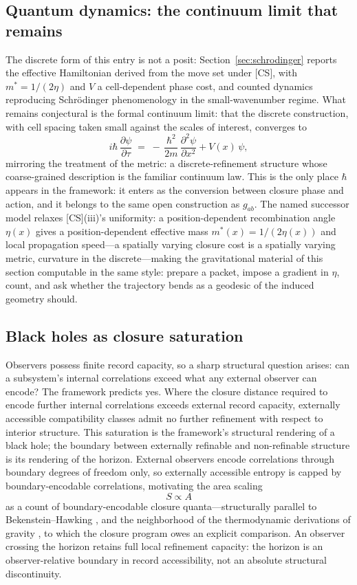 \documentclass[11pt]{article}
\theoremstyle{definition}
\theoremstyle{remark}
\begin{document}
\subsection{Quantum dynamics: the continuum limit that remains}
The discrete form of this entry is not a posit: Section~\ref{sec:schrodinger} reports the effective Hamiltonian derived from the move set under [CS], with $m^\ast = 1/(2\eta)$ and $V$ a cell-dependent phase cost, and counted dynamics reproducing Schr\"odinger phenomenology in the small-wavenumber regime. What remains conjectural is the formal continuum limit: that the discrete construction, with cell spacing taken small against the scales of interest, converges to
\[ i\hbar\, \frac{\partial \psi}{\partial \tau} \;=\; -\,\frac{\hbar^2}{2m}\, \frac{\partial^2 \psi}{\partial x^2} + V(x)\,\psi , \]
mirroring the treatment of the metric: a discrete-refinement structure whose coarse-grained description is the familiar continuum law. This is the only place $\hbar$ appears in the framework: it enters as the conversion between closure phase and action, and it belongs to the same open construction as $g_{ab}$. The named successor model relaxes [CS](iii)'s uniformity: a position-dependent recombination angle $\eta(x)$ gives a position-dependent effective mass $m^\ast(x) = 1/(2\eta(x))$ and local propagation speed---a spatially varying closure cost is a spatially varying metric, curvature in the discrete---making the gravitational material of this section computable in the same style: prepare a packet, impose a gradient in $\eta$, count, and ask whether the trajectory bends as a geodesic of the induced geometry should.

\subsection{Black holes as closure saturation}
Observers possess finite record capacity, so a sharp structural question arises: can a subsystem's internal correlations exceed what any external observer can encode? The framework predicts yes. Where the closure distance required to encode further internal correlations exceeds external record capacity, externally accessible compatibility classes admit no further refinement with respect to interior structure. This saturation is the framework's structural rendering of a black hole; the boundary between externally refinable and non-refinable structure is its rendering of the horizon. External observers encode correlations through boundary degrees of freedom only, so externally accessible entropy is capped by boundary-encodable correlations, motivating the area scaling
\[ S \propto A \]
as a count of boundary-encodable closure quanta---structurally parallel to Bekenstein--Hawking \cite{Bekenstein1973,Hawking1975}, and the neighborhood of the thermodynamic derivations of gravity \cite{Jacobson1995,Verlinde2011,VanRaamsdonk2010}, to which the closure program owes an explicit comparison. An observer crossing the horizon retains full local refinement capacity: the horizon is an observer-relative boundary in record accessibility, not an absolute structural discontinuity.
\end{document}
